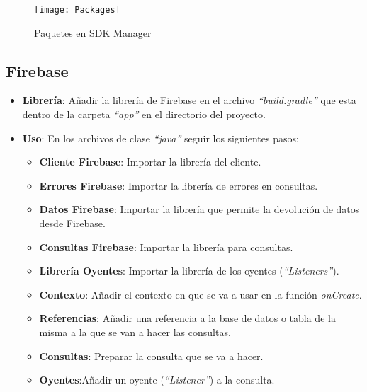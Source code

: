 		\begin{figure}[h]
			\centering
			\texttt{[image: Packages]}
			\caption{Paquetes en SDK Manager}
			\label{fig:SdkManagerPackages}
		\end{figure}
		
	\newpage %
	\subsection{Firebase}
		\begin{itemize}
			\item {\bf Librería}: Añadir la librería de Firebase en el archivo {\it ``build.gradle''} que esta dentro de la carpeta {\it ``app''} en el directorio del proyecto.
			\item {\bf Uso}: En los archivos de clase {\it ``java''}\cite{14:java:online} seguir los siguientes pasos:
				\begin{itemize}
					\item {\bf Cliente Firebase}: Importar la librería del cliente.
					\item {\bf Errores Firebase}: Importar la librería de errores en consultas.
					\item {\bf Datos Firebase}: Importar la librería que permite la devolución de datos desde Firebase.
					\item {\bf Consultas Firebase}: Importar la librería para consultas.
					\item {\bf Librería Oyentes}: Importar la librería de los oyentes ({\it ``Listeners''}).
					\item {\bf Contexto}: Añadir el contexto en que se va a usar en la función {\it onCreate}.
					\item {\bf Referencias}: Añadir una referencia a la base de datos o tabla de la misma a la que se van a hacer las consultas.
					\item {\bf Consultas}: Preparar la consulta que se va a hacer.
					\item {\bf Oyentes}:Añadir un oyente ({\it ``Listener''}) a la consulta.
				\end{itemize}
		\end{itemize}
		
		